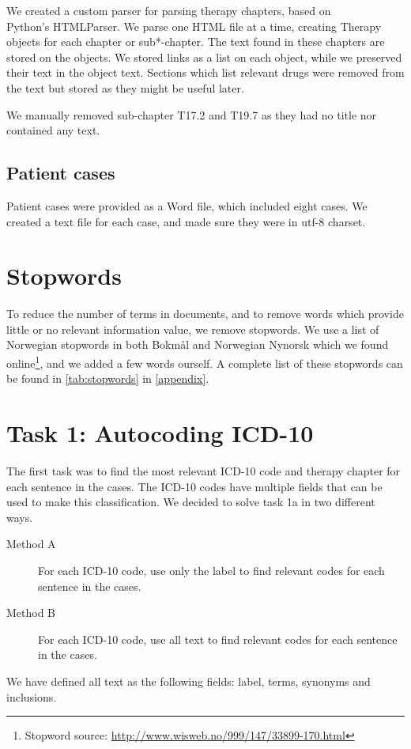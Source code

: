 We created a custom parser for parsing therapy chapters, based on\\
Python's HTMLParser. We parse one HTML file at a time, creating Therapy
objects for each chapter or sub*-chapter. The text found in these chapters are
stored on the objects. We stored links as a list on each object, while we
preserved their text in the object text. Sections which list relevant drugs
were removed from the text but stored as they might be useful later.

We manually removed sub-chapter T17.2 and T19.7 as they had no title nor
contained any text.

\subsection{Patient cases}
Patient cases were provided as a Word file, which included eight cases. We
created a text file for each case, and made sure they were in utf-8 charset.


\section{Stopwords}
To reduce the number of terms in documents, and to remove words which provide
little or no relevant information value, we remove stopwords.
We use a list of Norwegian stopwords in both Bokmål and Norwegian Nynorsk
which we found
online\footnote{Stopword source: \url{http://www.wisweb.no/999/147/33899-170.html}},
and we added a few words ourself. A complete list of these stopwords can
be found in \autoref{tab:stopwords} in \autoref{appendix}.


\section{Task 1: Autocoding ICD-10}
\label{sec:task1}
The first task was to find the most relevant ICD-10 code and therapy chapter for each sentence in the cases. The ICD-10 codes have multiple fields that can be used to make this classification. We decided to solve task 1a in two different ways.
\begin{description}
	\item[Method A] For each ICD-10 code, use only the label to find relevant codes for each sentence in the cases. 
	\item[Method B] For each ICD-10 code, use all text to find relevant codes for each sentence in the cases.
\end{description}
We have defined all text as the following fields: label, terms, synonyms and inclusions.

